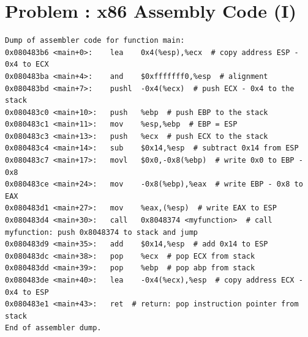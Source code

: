 \documentclass[12pt]{scrartcl}
\newcounter{exnum}
\newcommand{\exercise}[1]{\section*{Problem \theexnum\stepcounter{exnum}: #1}}
\begin{document}
\exercise{x86 Assembly Code (I)}




\begin{lstlisting}[language={}, caption=Assembler code for main]
Dump of assembler code for function main:
0x080483b6 <main+0>:	lea    0x4(%esp),%ecx  # copy address ESP - 0x4 to ECX
0x080483ba <main+4>:	and    $0xfffffff0,%esp  # alignment
0x080483bd <main+7>:	pushl  -0x4(%ecx)  # push ECX - 0x4 to the stack
0x080483c0 <main+10>:	push   %ebp  # push EBP to the stack
0x080483c1 <main+11>:	mov    %esp,%ebp  # EBP = ESP
0x080483c3 <main+13>:	push   %ecx  # push ECX to the stack
0x080483c4 <main+14>:	sub    $0x14,%esp  # subtract 0x14 from ESP
0x080483c7 <main+17>:	movl   $0x0,-0x8(%ebp)  # write 0x0 to EBP - 0x8
0x080483ce <main+24>:	mov    -0x8(%ebp),%eax  # write EBP - 0x8 to EAX 
0x080483d1 <main+27>:	mov    %eax,(%esp)  # write EAX to ESP
0x080483d4 <main+30>:	call   0x8048374 <myfunction>  # call myfunction: push 0x8048374 to stack and jump
0x080483d9 <main+35>:	add    $0x14,%esp  # add 0x14 to ESP
0x080483dc <main+38>:	pop    %ecx  # pop ECX from stack
0x080483dd <main+39>:	pop    %ebp  # pop abp from stack
0x080483de <main+40>:	lea    -0x4(%ecx),%esp  # copy address ECX - 0x4 to ESP
0x080483e1 <main+43>:	ret  # return: pop instruction pointer from stack
End of assembler dump.
\end{lstlisting}
\end{document}
